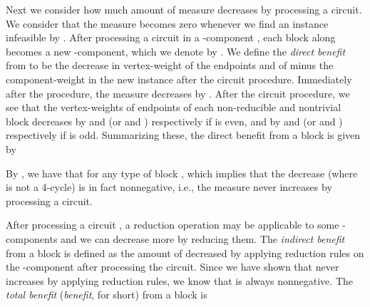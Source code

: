 \documentclass[runningheads]{llncs}
\begin{document}
\bigskip


\bigskip
Next we consider how much amount of measure decreases by processing a circuit.
We consider that the measure   becomes zero whenever
we find an instance infeasible by .
After processing a circuit
 in a -component ,
each block  along  becomes a new -component, which we denote by .
We define the {\em direct benefit}  from  to
be the decrease in vertex-weight of the endpoints  and  of 
minus the component-weight  in the new instance after the circuit procedure.
Immediately after the procedure, the measure  decreases
by .
After the circuit procedure, we see that
the vertex-weights of endpoints of each non-reducible and nontrivial block  decreases
by  and  (or  and ) respectively if   is even,
and
by  and  (or  and ) respectively if  is odd.
Summarizing these, the direct benefit  from a block  is given
by


By , we have that  for any type of block , which implies that
the decrease  (where  is not a 4-cycle) is in fact nonnegative,
i.e.,    the measure  never increases by processing a circuit.

After processing a circuit , a reduction operation may be applicable to some -components 
 and we can decrease  more by reducing them. The \emph{indirect benefit}  from a block  is defined as the amount of  decreased by applying reduction rules on the -component  after processing the circuit. Since we have shown that  never increases by applying reduction rules, we know that   is always nonnegative. The \emph{total benefit} (\emph{benefit}, for short) from a block  is


\bigskip
\end{document}
